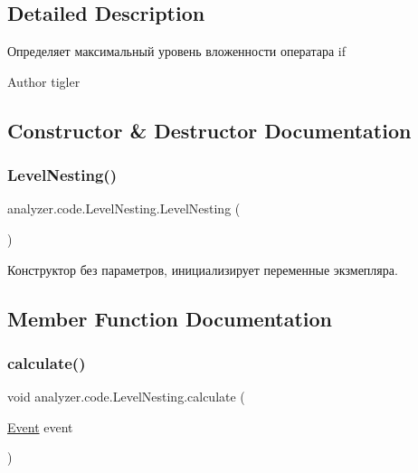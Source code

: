\subsection{Detailed Description}
Определяет максимальный уровень вложенности оператара if \begin{DoxyAuthor}{Author}
tigler 
\end{DoxyAuthor}


\subsection{Constructor \& Destructor Documentation}
\mbox{\label{classanalyzer_1_1code_1_1LevelNesting_ae2b01629780a540f7e261ce2c59d654e}} 
\subsubsection{\texorpdfstring{Level\+Nesting()}{LevelNesting()}}
{\footnotesize\ttfamily analyzer.\+code.\+Level\+Nesting.\+Level\+Nesting (\begin{DoxyParamCaption}{ }\end{DoxyParamCaption})\hspace{0.3cm}{\ttfamily [inline]}}

Конструктор без параметров, инициализирует переменные экзмепляра. 

\subsection{Member Function Documentation}
\mbox{\label{classanalyzer_1_1code_1_1LevelNesting_a09431a19031d65f2e53257c9d10beb49}} 
\subsubsection{\texorpdfstring{calculate()}{calculate()}}
{\footnotesize\ttfamily void analyzer.\+code.\+Level\+Nesting.\+calculate (\begin{DoxyParamCaption}\item[{\hyperlink{classanalyzer_1_1code_1_1Event}{Event}}]{event }\end{DoxyParamCaption})\hspace{0.3cm}{\ttfamily [inline]}}

